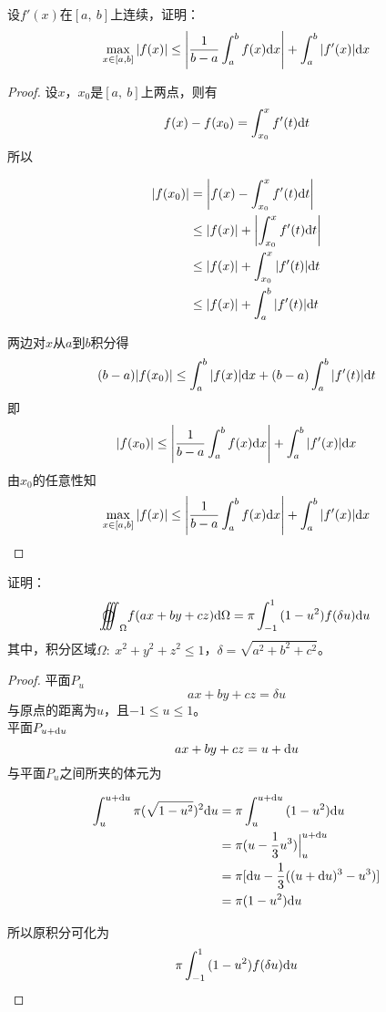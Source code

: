 \begin{proposition}
    
    设$f'(x)$在$[a,\ b]$上连续，证明：
    $$\max_{x\in[a,b]}{|f(x)|} \leq \left|\dfrac{1}{b - a}\int_{a}^{b}{f(x)}\mathrm{d} x\right| + \int_{a}^{b}{|f'(x)|}\mathrm{d} x$$

\end{proposition}

\begin{proof}

    设$x$，$x_0$是$[a,\ b]$上两点，则有
    $$f(x) - f(x_0) = \int_{x_0}^{x}{f'(t)}\mathrm{d} t$$
    所以

    \begin{align*}
        |f(x_0)| & = \left|f(x) - \int_{x_0}^{x}{f'(t)}\mathrm{d} t \right| \\
        & \leq |f(x)| + \left|\int_{x_0}^{x}{f'(t)}\mathrm{d} t \right| \\
        & \leq |f(x)| +  \int_{x_0}^{x}{|f'(t)|}\mathrm{d} t \\
        & \leq |f(x)| +  \int_{a}^{b}{|f'(t)|}\mathrm{d} t \\
    \end{align*}

    两边对$x$从$a$到$b$积分得
    $$(b - a)|f(x_0)| \leq \int_{a}^{b}{|f(x)|}\mathrm{d} x + (b - a)\int_{a}^{b}{|f'(t)|}\mathrm{d} t$$
    即
    $$|f(x_0)| \leq \left|\dfrac{1}{b - a}\int_{a}^{b}{f(x)}\mathrm{d} x\right| + \int_{a}^{b}{|f'(x)|}\mathrm{d} x$$
    由$x_0$的任意性知
    $$\max_{x\in[a,b]}{|f(x)|} \leq \left|\dfrac{1}{b - a}\int_{a}^{b}{f(x)}\mathrm{d} x\right| + \int_{a}^{b}{|f'(x)|}\mathrm{d} x$$
    
\end{proof}

\begin{theorem}

    证明：
    $$\oooint_{\Omega}{f(ax + by + cz)}\diff \Omega = \pi \int_{-1}^{1}{(1 - u^2)f(\delta u)}\diff u$$
    其中，积分区域$\Omega:\ x^2 + y^2 + z^2 \leq 1$，$\delta = \sqrt{a^2 + b^2 + c^2}$。

\end{theorem}

\begin{proof}

    平面$P_u$
    $$ax + by + cz = \delta u$$
    与原点的距离为$u$，且$-1 \leq u \leq 1$。\\
    平面$P_{u + \mathrm{d} u}$
    $$ax + by + cz = u + \mathrm{d} u$$
    与平面$P_u$之间所夹的体元为
    
    \begin{align*}
        \int_{u}^{u + \mathrm{d} u}{\pi (\sqrt{1 - u^2})^2}\mathrm{d} u & = \pi \int_{u}^{u + \mathrm{d} u}{(1 - u^2)}\mathrm{d} u \\
        & = \pi (u - \dfrac{1}{3}u^3) \Big|_{u}^{u + \mathrm{d} u} \\
        & = \pi [\mathrm{d} u - \dfrac{1}{3}((u + \mathrm{d} u)^3 - u^3)] \\
        & = \pi (1 - u^2)\mathrm{d} u
    \end{align*}

    所以原积分可化为
    $$\pi \int_{-1}^{1}{(1 - u^2)f(\delta u)}\mathrm{d} u$$

\end{proof}


